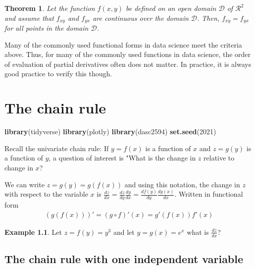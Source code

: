 \documentclass[
]{book}
\newenvironment{Shaded}{\begin{snugshade}}{\end{snugshade}}
\newcommand{\DecValTok}[1]{\textcolor[rgb]{0.00,0.00,0.81}{#1}}
\newcommand{\KeywordTok}[1]{\textcolor[rgb]{0.13,0.29,0.53}{\textbf{#1}}}
\newcommand{\NormalTok}[1]{#1}
\newtheorem{theorem}{Theorem}[chapter]
\theoremstyle{definition}
\theoremstyle{definition}
\newtheorem{example}{Example}[chapter]
\theoremstyle{definition}
\theoremstyle{definition}
\theoremstyle{remark}
\begin{document}
\begin{theorem}
Let the function \(f(x, y)\) be defined on an open domain \(\mathcal{D}\) of \(\mathcal{R}^2\) and assume that \(f_{xy}\) and \(f_{yx}\) are continuous over the domain \(\mathcal{D}\). Then, \(f_{xy} = f_{yx}\) for all points in the domain \(\mathcal{D}\).
\end{theorem}

Many of the commonly used functional forms in data science meet the criteria above. Thus, for many of the commonly used functions in data science, the order of evaluation of partial derivatives often does not matter. In practice, it is always good practice to verify this though.

\hypertarget{the-chain-rule}{%
\chapter{The chain rule}\label{the-chain-rule}}

\begin{Shaded}
\begin{Highlighting}[]
\KeywordTok{library}\NormalTok{(tidyverse)}
\KeywordTok{library}\NormalTok{(plotly)}
\KeywordTok{library}\NormalTok{(dasc2594)}
\KeywordTok{set.seed}\NormalTok{(}\DecValTok{2021}\NormalTok{)}
\end{Highlighting}
\end{Shaded}

Recall the univariate chain rule: If \(y = f(x)\) is a function of \(x\) and \(z = g(y)\) is a function of \(y\), a question of interest is "What is the change in \(z\) relative to change in \(x\)?

We can write \(z = g(y) = g(f(x))\) and using this notation, the change in \(z\) with respect to the variable \(x\) is \(\frac{dz}{dx} = \frac{dz}{dy}\frac{dy}{dx} = \frac{df(y)}{dy}\frac{dg(x)}{dx}\). Written in functional form
\[
\begin{aligned}
(g(f(x)))' = (g \circ f)'(x) = g'(f(x)) f'(x)
\end{aligned}
\]

\begin{example}
Let \(z = f(y) = y^3\) and let \(y = g(x) = e^{x}\) what is \(\frac{dz}{dx}\)?
\end{example}

\hypertarget{the-chain-rule-with-one-independent-variable}{%
\section{The chain rule with one independent variable}\label{the-chain-rule-with-one-independent-variable}}
\end{document}

